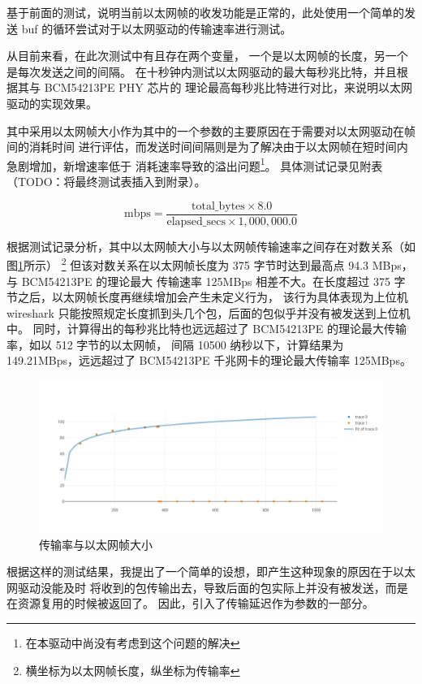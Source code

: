     基于前面的测试，说明当前以太网帧的收发功能是正常的，此处使用一个简单的发送 buf
    的循环尝试对于以太网驱动的传输速率进行测试。

    从目前来看，在此次测试中有且存在两个变量， 一个是以太网帧的长度，另一个是每次发送之间的间隔。
    在十秒钟内测试以太网驱动的最大每秒兆比特，并且根据其与 BCM54213PE PHY 芯片的
    理论最高每秒兆比特进行对比，来说明以太网驱动的实现效果。

    其中采用以太网帧大小作为其中的一个参数的主要原因在于需要对以太网驱动在帧间的消耗时间
    进行评估，而发送时间间隔则是为了解决由于以太网帧在短时间内急剧增加，新增速率低于
    消耗速率导致的溢出问题\footnote{在本驱动中尚没有考虑到这个问题的解决}。
    具体测试记录见附表（TODO：将最终测试表插入到附录）。

    $$\text{mbps} = \frac{\text{total\_bytes} \times 8.0}{\text{elapsed\_secs} \times 1,000,000.0}$$

    根据测试记录分析，其中以太网帧大小与以太网帧传输速率之间存在对数关系（如图\ref{test::传输率与以太网帧大小}所示）
    \footnote{横坐标为以太网帧长度，纵坐标为传输率}
    但该对数关系在以太网帧长度为 375 字节时达到最高点 94.3 MBps，与 BCM54213PE 的理论最大
    传输速率 125MBps 相差不大。在长度超过 375 字节之后，以太网帧长度再继续增加会产生未定义行为，
    该行为具体表现为上位机 wireshark 只能按照规定长度抓到头几个包，后面的包似乎并没有被发送到上位机中。
    同时，计算得出的每秒兆比特也远远超过了 BCM54213PE 的理论最大传输率，如以 512 字节的以太网帧， 间隔 10500 纳秒以下，计算结果为 149.21MBps，远远超过了 BCM54213PE 千兆网卡的理论最大传输率 125MBps。

    \begin{figure}[ht]
        \centering
        \caption{传输率与以太网帧大小}    \label{test::传输率与以太网帧大小}
        \includegraphics[width=\textwidth]{./imgs/测试-传输率与以太网帧大小.png}
    \end{figure}   

    根据这样的测试结果，我提出了一个简单的设想，即产生这种现象的原因在于以太网驱动没能及时
    将收到的包传输出去，导致后面的包实际上并没有被发送，而是在资源复用的时候被返回了。
    因此，引入了传输延迟作为参数的一部分。


